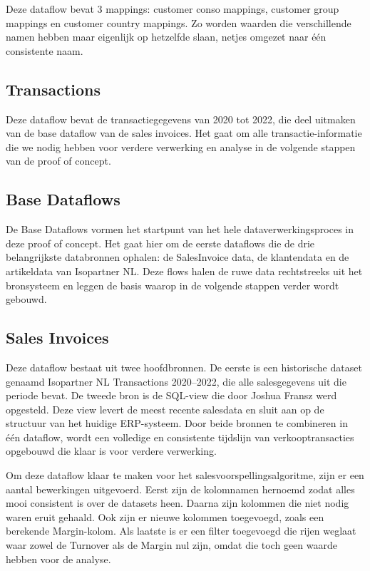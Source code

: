 Deze dataflow bevat 3 mappings: customer conso mappings, customer group mappings en customer country mappings. Zo worden waarden die verschillende namen hebben maar eigenlijk op hetzelfde slaan, netjes omgezet naar één consistente naam.

\subsection*{Transactions}

Deze dataflow bevat de transactiegegevens van 2020 tot 2022, die deel uitmaken van de base dataflow van de sales invoices. Het gaat om alle transactie-informatie die we nodig hebben voor verdere verwerking en analyse in de volgende stappen van de proof of concept.


\subsection{Base Dataflows}

De Base Dataflows vormen het startpunt van het hele dataverwerkingsproces in deze proof of concept. Het gaat hier om de eerste dataflows die de drie belangrijkste databronnen ophalen: de SalesInvoice data, de klantendata en de artikeldata van Isopartner NL. Deze flows halen de ruwe data rechtstreeks uit het bronsysteem en leggen de basis waarop in de volgende stappen verder wordt gebouwd.

\subsection*{Sales Invoices}

Deze dataflow bestaat uit twee hoofdbronnen. De eerste is een historische dataset genaamd Isopartner NL Transactions 2020–2022, die alle salesgegevens uit die periode bevat. De tweede bron is de SQL-view die door Joshua Fransz werd opgesteld. Deze view levert de meest recente salesdata en sluit aan op de structuur van het huidige ERP-systeem. Door beide bronnen te combineren in één dataflow, wordt een volledige en consistente tijdslijn van verkooptransacties opgebouwd die klaar is voor verdere verwerking.

\vspace{1 em}

Om deze dataflow klaar te maken voor het salesvoorspellingsalgoritme, zijn er een aantal bewerkingen uitgevoerd. Eerst zijn de kolomnamen hernoemd zodat alles mooi consistent is over de datasets heen. Daarna zijn kolommen die niet nodig waren eruit gehaald. Ook zijn er nieuwe kolommen toegevoegd, zoals een berekende Margin-kolom. Als laatste is er een filter toegevoegd die rijen weglaat waar zowel de Turnover als de Margin nul zijn, omdat die toch geen waarde hebben voor de analyse.

